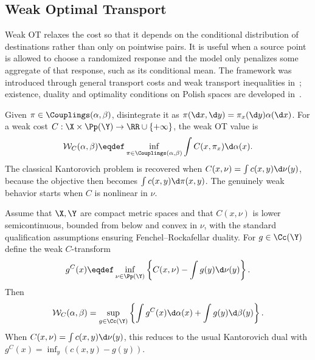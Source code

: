 

\subsection{Weak Optimal Transport}
\label{sec-weak-ot}

Weak OT relaxes the cost so that it depends on the conditional distribution of destinations rather than only on pointwise pairs. It is useful when a source point is allowed to choose a randomized response and the model only penalizes some aggregate of that response, such as its conditional mean. The framework was introduced through general transport costs and weak transport inequalities in~\cite{gozlan2017kantorovich}; existence, duality and optimality conditions on Polish spaces are developed in~\cite{backhoff2019weak}.

Given $\pi\in\Couplings(\alpha,\beta)$, disintegrate it as $\pi(\d x,\d y)=\pi_x(\d y)\alpha(\d x)$. For a weak cost $C:\X\times\Pp(\Y)\to\RR\cup\{+\infty\}$, the weak OT value is
\begin{equation}\label{eq-weak-ot}
	\mathcal{W}_C(\alpha,\beta)
	\eqdef
	\inf_{\pi\in\Couplings(\alpha,\beta)}
	\int C(x,\pi_x)\d\alpha(x).
\end{equation}
The classical Kantorovich problem is recovered when $C(x,\nu)=\int c(x,y)\d\nu(y)$, because the objective then becomes $\int c(x,y)\d\pi(x,y)$. The genuinely weak behavior starts when $C$ is nonlinear in $\nu$.

\begin{prop}\label{prop-weak-ot-duality}
	Assume that $\X,\Y$ are compact metric spaces and that $C(x,\nu)$ is lower semicontinuous, bounded from below and convex in $\nu$, with the standard qualification assumptions ensuring Fenchel--Rockafellar duality. For $g\in\Cc(\Y)$ define the weak $C$-transform
	\[
		g^C(x)
		\eqdef
		\inf_{\nu\in\Pp(\Y)}
		\left\{
			C(x,\nu)-\int g(y)\d\nu(y)
		\right\}.
	\]
	Then
	\[
		\mathcal{W}_C(\alpha,\beta)
		=
		\sup_{g\in\Cc(\Y)}
		\left\{
			\int g^C(x)\d\alpha(x)+\int g(y)\d\beta(y)
		\right\}.
	\]
	When $C(x,\nu)=\int c(x,y)\d\nu(y)$, this reduces to the usual Kantorovich dual with $g^C(x)=\inf_y(c(x,y)-g(y))$.
\end{prop}

